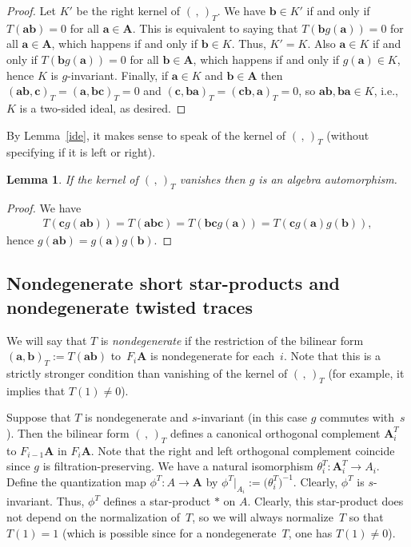 \documentclass[pdftex]{sigma}
\numberwithin{equation}{section}
\newtheorem{Lemma}[Theorem]{Lemma}
\begin{document}
\begin{proof} Let $K'$ be the right kernel of $(\,,\,)_T$. We have ${\mathbf b}\in K'$ if and only if $T({\textbf{ab}})=0$ for all ${\mathbf a}\in {{\mathbf A}}$. This is equivalent to saying that $T({\mathbf b}g({\mathbf a}))=0$ for all ${\mathbf a}\in {{\mathbf A}}$, which happens if and only if ${\mathbf b}\in K$. Thus, $K'=K$. Also ${\mathbf a}\in K$ if and only if $T({\mathbf b}g({\mathbf a}))=0$ for all ${\mathbf b}\in {\mathbf A}$, which happens if and only if $g({\mathbf a})\in K$, hence $K$ is $g$-invariant. Finally, if ${\mathbf a}\in K$ and ${\mathbf b}\in {{\mathbf A}}$
then $({\textbf{ab}},{\textbf{c}})_T= ({\textbf{a}},{\textbf{bc}})_T=0$ and $({\textbf{c}},{\textbf{ba}})_T=({\textbf{cb}},{\textbf{a}})_T=0$, so ${\textbf{ab}},{\textbf{ba}}\in K$, i.e., $K$ is a two-sided ideal, as desired.
\end{proof}

By Lemma~\ref{ide}, it makes sense to speak of the kernel of $(\,,\,)_T$ (without specifying if it is left or right).

\begin{Lemma} If the kernel of $(\,,\,)_T$ vanishes then $g$ is an algebra automorphism.
\end{Lemma}

\begin{proof}We have
\begin{gather*}
T({\mathbf c}g({\mathbf a}{\mathbf b}))=T({\textbf{abc}})=T({\textbf{bc}}g({\mathbf a}))=T({\mathbf c}g({\mathbf a})g({\mathbf b})),
\end{gather*}
hence $g({\mathbf{ab}})=g({\mathbf a})g({\mathbf b})$.
\end{proof}

\subsection{Nondegenerate short star-products and nondegenerate twisted traces}

We will say that $T$ is {\it nondegenerate} if the restriction of the bilinear form $({\mathbf a},{\mathbf b})_T:=T({\mathbf a}{\mathbf b})$ to~$F_i{{\mathbf A}}$ is nondegenerate for each~$i$. Note that this is a strictly stronger condition than vanishing of the kernel of $(\,,\,)_T$ (for example, it implies that $T(1)\ne 0$).

Suppose that $T$ is nondegenerate and $s$-invariant (in this case $g$ commutes with~$s$). Then the bilinear form $(\,,\,)_T$ defines a canonical orthogonal complement ${\mathbf A}^T_i$ to $F_{i-1}{{\mathbf A}}$ in $F_i{{\mathbf A}}$. Note that the right and left orthogonal complement coincide since $g$ is filtration-preserving. We have a natural isomorphism $\theta_i^T\colon {\mathbf A}_i^T\to A_i$. Define the quantization map $\phi^T\colon A\to {{\mathbf A}}$ by $\phi^T|_{A_i}:=\big(\theta_i^T\big)^{-1}$. Clearly, $\phi^T$ is $s$-invariant. Thus, $\phi^T$ defines a star-product $*$ on $A$. Clearly, this star-product does not depend on the normalization of~$T$, so we will always normalize~$T$ so that $T(1)=1$ (which is possible since for a nondegenerate~$T$, one has $T(1)\ne 0$).
\end{document}

